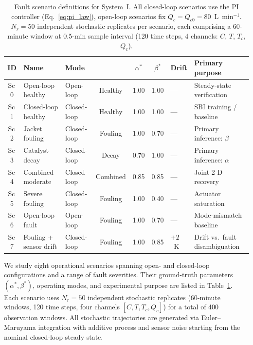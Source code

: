 \documentclass[aps,pre,twocolumn,superscriptaddress]{revtex4-2}
\begin{document}
\begin{table}[htbp]
\centering
\caption{Fault scenario definitions for System~I.  All closed-loop scenarios
  use the PI controller (Eq.~\eqref{eq:pi_law}), open-loop scenarios fix
  $Q_c = Q_{c0} = 80$~L~min$^{-1}$. $N_r = 50$ independent stochastic
  replicates per scenario, each comprising a 60-minute window at
  0.5-min sample interval (120 time steps, 4 channels:
  $C$, $T$, $T_c$, $Q_c$).}
\label{tab:scenarios_system1}
\small
\begin{tabular}{cllcccll}
\toprule
ID & Name & Mode & & $\alpha^*$ & $\beta^*$ & Drift & Primary purpose \\
\midrule
Sc\,0 & Open-loop healthy      & Open-loop   & Healthy & 1.00 & 1.00 & ---    & Steady-state verification \\
Sc\,1 & Closed-loop healthy    & Closed-loop & Healthy & 1.00 & 1.00 & ---    & SBI training / baseline \\
Sc\,2 & Jacket fouling         & Closed-loop & Fouling  & 1.00 & 0.70 & ---    & Primary inference: $\beta$ \\
Sc\,3 & Catalyst decay         & Closed-loop & Decay  & 0.70 & 1.00 & ---    & Primary inference: $\alpha$ \\
Sc\,4 & Combined moderate      & Closed-loop & Combined & 0.85 & 0.85 & ---    & Joint 2-D recovery \\
Sc\,5 & Severe fouling         & Closed-loop & Fouling  & 1.00 & 0.40 & ---    & Actuator saturation \\
Sc\,6 & Open-loop fault        & Open-loop   & Fouling  & 1.00 & 0.70 & ---    & Mode-mismatch baseline \\
Sc\,7 & Fouling + sensor drift & Closed-loop & Fouling  & 1.00 & 0.85 & $+2$~K & Drift vs.\ fault disambiguation \\
\bottomrule
\end{tabular}
\end{table}

We study eight operational scenarios spanning open- and closed-loop configurations and a range of fault severities. Their ground-truth parameters $(\alpha^*,\beta^*)$, operating modes, and experimental purpose are listed in Table~\ref{tab:scenarios_system1}. Each scenario uses $N_r = 50$ independent stochastic replicates (60-minute windows, 120 time steps, four channels $[C, T, T_c, Q_c]$) for a total of 400 observation windows. All stochastic trajectories are generated via Euler--Maruyama integration with additive process and sensor noise starting from the nominal closed-loop steady state.
\end{document}
